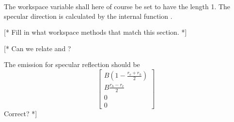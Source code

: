  The workspace variable  shall here
 of course be set to have the length 1. The specular direction is
 calculated by the internal function .

 [* Fill in what workspace methods that match this section. *]


 \label{sec:rte:surface:emission}
 
 [* Can we relate  and
 ? 

 The emission for specular reflection should be 
 \begin{equation}
    \left[\begin{array}{c}
      B\left(1-\frac{r_v+r_h}{2}\right) \\
      B\frac{r_h-r_v}{2} \\
      0\\0
    \end{array}\right]
 \end{equation}
 Correct? *]



